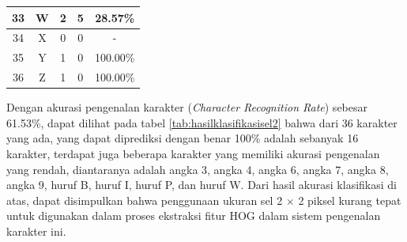 \begin{longtable}[c]{|c|c|c|c|c|}
	33           & W                 & 2                       & 5                       &28.57\%            \\ \hline
	34           & X                 & 0                       & 0                       & -            \\ \hline
	35           & Y                 & 1                       & 0                       &100.00\%            \\ \hline
	36           & Z                 & 1                       & 0                       &100.00\%            \\ \hline
\end{longtable}

\noindent Dengan akurasi pengenalan karakter (\textit{Character Recognition Rate}) sebesar 61.53\%, dapat dilihat pada tabel \ref{tab:hasilklasifikasisel2} bahwa dari 36  karakter yang ada, yang dapat diprediksi dengan benar 100\% adalah sebanyak 16 karakter, terdapat juga beberapa karakter yang memiliki akurasi pengenalan yang rendah, diantaranya adalah angka 3, angka 4, angka 6, angka 7, angka 8, angka 9, huruf B, huruf I, huruf P, dan huruf W. Dari hasil akurasi klasifikasi di atas, dapat disimpulkan bahwa penggunaan ukuran sel 2 $\times$ 2 piksel kurang tepat untuk digunakan dalam proses ekstraksi fitur HOG dalam sistem pengenalan karakter ini.\\

